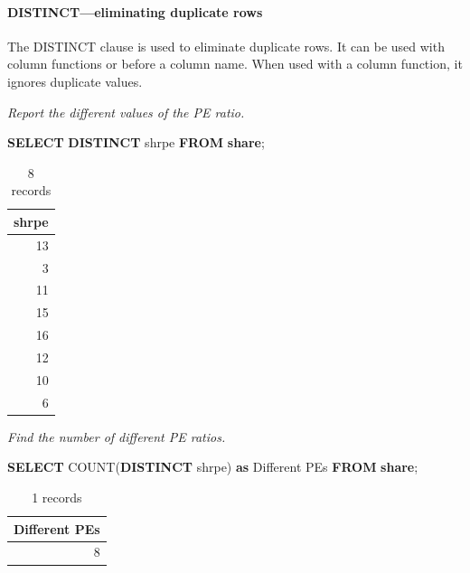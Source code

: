 \documentclass[
]{article}
\newenvironment{Shaded}{\begin{snugshade}}{\end{snugshade}}
\newcommand{\FunctionTok}[1]{\textcolor[rgb]{0.00,0.00,0.00}{#1}}
\newcommand{\KeywordTok}[1]{\textcolor[rgb]{0.13,0.29,0.53}{\textbf{#1}}}
\newcommand{\NormalTok}[1]{#1}
\newcommand{\StringTok}[1]{\textcolor[rgb]{0.31,0.60,0.02}{#1}}
\begin{document}
\hypertarget{distincteliminating-duplicate-rows}{%
\paragraph*{DISTINCT---eliminating duplicate rows}\label{distincteliminating-duplicate-rows}}

The DISTINCT clause is used to eliminate duplicate rows. It can be used with column functions or before a column name. When used with a column function, it ignores duplicate values.

\emph{Report the different values of the PE ratio.}

\begin{Shaded}
\begin{Highlighting}[]
\KeywordTok{SELECT} \KeywordTok{DISTINCT}\NormalTok{ shrpe }\KeywordTok{FROM} \KeywordTok{share}\NormalTok{;}
\end{Highlighting}
\end{Shaded}

\begin{table}

\caption{\label{tab:unnamed-chunk-32}8 records}
\centering
\begin{tabular}[t]{r}
\hline
shrpe\\
\hline
13\\
\hline
3\\
\hline
11\\
\hline
15\\
\hline
16\\
\hline
12\\
\hline
10\\
\hline
6\\
\hline
\end{tabular}
\end{table}

\emph{Find the number of different PE ratios.}

\begin{Shaded}
\begin{Highlighting}[]
\KeywordTok{SELECT} \FunctionTok{COUNT}\NormalTok{(}\KeywordTok{DISTINCT}\NormalTok{ shrpe) }\KeywordTok{as} \StringTok{\textquotesingle{}Different PEs\textquotesingle{}} \KeywordTok{FROM} \KeywordTok{share}\NormalTok{;}
\end{Highlighting}
\end{Shaded}

\begin{table}

\caption{\label{tab:unnamed-chunk-33}1 records}
\centering
\begin{tabular}[t]{r}
\hline
Different PEs\\
\hline
8\\
\hline
\end{tabular}
\end{table}
\end{document}
